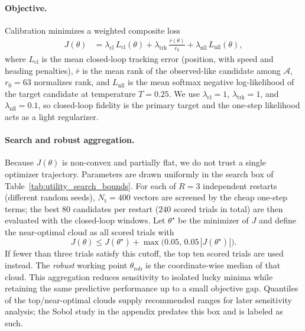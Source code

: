 \documentclass[conference]{IEEEtran}
\begin{document}
\paragraph{Objective.}
Calibration minimizes a weighted composite loss
\begin{equation}
\begin{aligned}
J(\theta)
&=
\lambda_{\mathrm{cl}}\,L_{\mathrm{cl}}(\theta)
+
\lambda_{\mathrm{trk}}\,\frac{\bar r(\theta)}{r_0}
+
\lambda_{\mathrm{nll}}\,L_{\mathrm{nll}}(\theta),
\end{aligned}
\label{eq:calibration_objective}
\end{equation}
where $L_{\mathrm{cl}}$ is the mean closed-loop tracking error (position, with speed and heading penalties), $\bar r$ is the mean rank of the observed-like candidate among $\mathcal{A}$, $r_0=63$ normalizes rank, and $L_{\mathrm{nll}}$ is the mean softmax negative log-likelihood of the target candidate at temperature $T=0.25$. We use $\lambda_{\mathrm{cl}}=1$, $\lambda_{\mathrm{trk}}=1$, and $\lambda_{\mathrm{nll}}=0.1$, so closed-loop fidelity is the primary target and the one-step likelihood acts as a light regularizer.

\paragraph{Search and robust aggregation.}
Because $J(\theta)$ is non-convex and partially flat, we do not trust a single optimizer trajectory. Parameters are drawn uniformly in the search box of Table~\ref{tab:utility_search_bounds}. For each of $R=3$ independent restarts (different random seeds), $N_{\mathrm{t}}=400$ vectors are screened by the cheap one-step terms; the best $80$ candidates per restart ($240$ scored trials in total) are then evaluated with the closed-loop windows. Let $\theta^\star$ be the minimizer of $J$ and define the near-optimal cloud as all scored trials with
\[
J(\theta)\le J(\theta^\star)+\max\bigl(0.05,\,0.05\,|J(\theta^\star)|\bigr).
\]
If fewer than three trials satisfy this cutoff, the top ten scored trials are used instead. The \emph{robust} working point $\theta_{\mathrm{rob}}$ is the coordinate-wise median of that cloud. This aggregation reduces sensitivity to isolated lucky minima while retaining the same predictive performance up to a small objective gap. Quantiles of the top/near-optimal clouds supply recommended ranges for later sensitivity analysis; the Sobol study in the appendix predates this box and is labeled as such.
\end{document}

